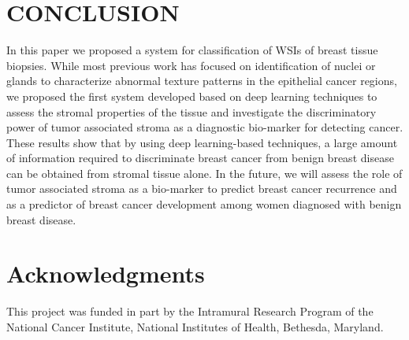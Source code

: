 \documentclass{article}
\begin{document}
\section{CONCLUSION}
\vspace*{-4 pt}
In this paper we proposed a system for classification of WSIs of breast tissue biopsies. While most previous work has focused on identification of nuclei or glands to characterize abnormal texture patterns in the epithelial cancer regions, we proposed the first system developed based on deep learning techniques to assess the stromal properties of the tissue and investigate the discriminatory power of tumor associated stroma as a diagnostic bio-marker for detecting cancer. These results show that by using deep learning-based techniques, a large amount of information required to discriminate breast cancer from benign breast disease can be obtained from stromal tissue alone. In the future, we will assess the role of tumor associated stroma as a bio-marker to predict breast cancer recurrence and as a predictor of breast cancer development among women diagnosed with benign breast disease.

\section{Acknowledgments}
\vspace*{-4 pt}
This project was funded in part by the Intramural Research Program of the National Cancer Institute, National Institutes of Health, Bethesda, Maryland.

\label{sec:ref}



\end{document}

